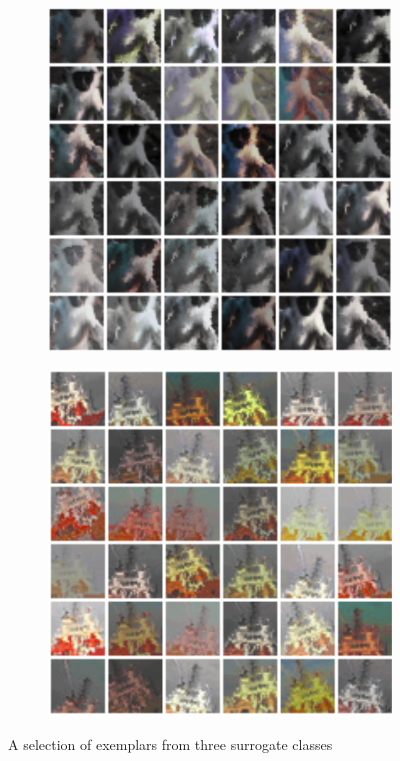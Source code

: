 \documentclass{article} %
\begin{document}
\begin{figure}[h]
\begin{subfigure}{0.2\textwidth}
  \includegraphics[width=\textwidth]{figs/patch_noflip_lemur.png}
\end{subfigure}
\begin{subfigure}{0.2\textwidth}
  \centering
  \includegraphics[width=\textwidth]{figs/patch_noflip_boattop.png}
\end{subfigure}
\caption{A selection of exemplars from three surrogate classes}
\label{figpatch}
\end{figure}
\end{document}
